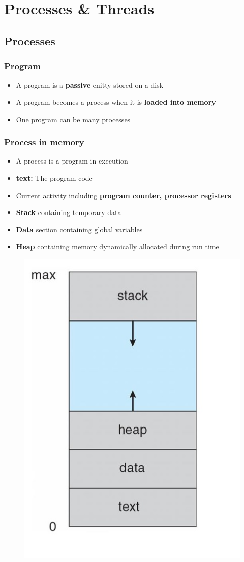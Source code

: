 \documentclass[11pt]{article}
\theoremstyle{definition}
\begin{document}
    \section{Processes \& Threads}
        \subsection{Processes}
        \subsubsection{Program}
        \begin{itemize}
            \item A program is a \textbf{passive} enitty stored on a disk
            \item A program becomes a process when it is \textbf{loaded into memory}
            \item One program can be many processes
        \end{itemize}
        \subsubsection{Process in memory}
        \begin{itemize}
            \item A process is a program in execution
            \item \textbf{text:} The program code
            \item Current activity including \textbf{program counter, processor registers}
            \item \textbf{Stack} containing temporary data
            \item \textbf{Data} section containing global variables
            \item \textbf{Heap} containing memory dynamically allocated during run time
        \end{itemize}
            \begin{figure}[htbp]
            \centering
                \includegraphics[width=0.30\linewidth]{img/process_in_memory.jpg}
                \label{fig:enter-label}
            \end{figure}
\end{document}
